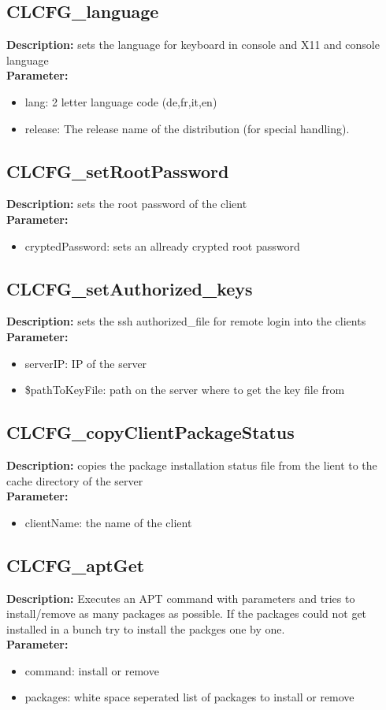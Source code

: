 \subsection{CLCFG\_language}
\textbf{Description:} sets the language for keyboard in console and X11 and console language\\
\textbf{Parameter:}
\begin{itemize}
\item lang: 2 letter language code (de,fr,it,en)
\item release: The release name of the distribution (for special handling).
\end{itemize}

\subsection{CLCFG\_setRootPassword}
\textbf{Description:} sets the root password of the client\\
\textbf{Parameter:}
\begin{itemize}
\item cryptedPassword: sets an allready crypted root password
\end{itemize}

\subsection{CLCFG\_setAuthorized\_keys}
\textbf{Description:} sets the ssh authorized\_file for remote login into the clients\\
\textbf{Parameter:}
\begin{itemize}
\item serverIP: IP of the server
\item \$pathToKeyFile: path on the server where to get the key file from
\end{itemize}

\subsection{CLCFG\_copyClientPackageStatus}
\textbf{Description:} copies the package installation status file from the lient to the cache directory of the server\\
\textbf{Parameter:}
\begin{itemize}
\item clientName: the name of the client
\end{itemize}

\subsection{CLCFG\_aptGet}
\textbf{Description:} Executes an APT command with parameters and tries to install/remove as many packages as possible. If the packages could not get installed in a bunch try to install the packges one by one.\\
\textbf{Parameter:}
\begin{itemize}
\item command: install or remove
\item packages: white space seperated list of packages to install or remove
\end{itemize}


